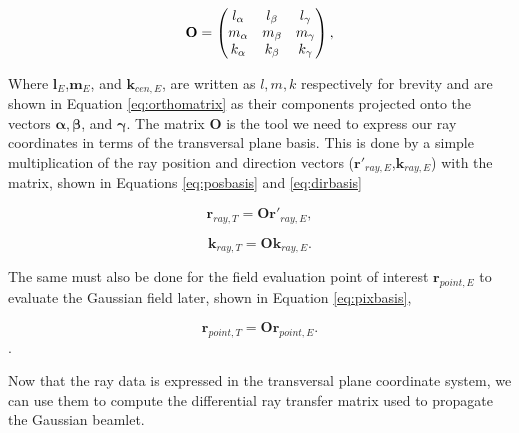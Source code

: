 \begin{equation}
\centering
\mathbf{O} = 
    \begin{pmatrix}
     l_{\alpha} & l_{\beta} & l_{\gamma} \\
     m_{\alpha} & m_{\beta} & m_{\gamma} \\
     k_{\alpha} & k_{\beta} & k_{\gamma} \\
    \end{pmatrix},
    \label{eq:orthomatrix}
\end{equation}

Where $\mathbf{l}_{E}$,$\mathbf{m}_{E}$, and $\mathbf{k}_{cen,E}$, are written as $l,m,k$ respectively for brevity and are shown in Equation \ref{eq:orthomatrix} as their components projected onto the vectors $\boldsymbol{\alpha},\boldsymbol{\beta}$, and $\boldsymbol{\gamma}$. The matrix $\mathbf{O}$ is the tool we need to express our ray coordinates in terms of the transversal plane basis. This is done by a simple multiplication of the ray position and direction vectors ($\mathbf{r}'_{ray,E}$,$\mathbf{k}_{ray,E}$) with the matrix, shown in Equations \ref{eq:posbasis} and \ref{eq:dirbasis}

\begin{equation}
    \mathbf{r}_{ray,T} = \mathbf{O}\mathbf{r}'_{ray,E},
    \label{eq:posbasis}
\end{equation}

\begin{equation}
    \mathbf{k}_{ray,T} = \mathbf{O}\mathbf{k}_{ray,E}.
    \label{eq:dirbasis}
\end{equation}

The same must also be done for the field evaluation point of interest $\mathbf{r}_{point,E}$ to evaluate the Gaussian field later, shown in Equation \ref{eq:pixbasis},

\begin{equation}
    \mathbf{r}_{point,T} = \mathbf{O}\mathbf{r}_{point,E}.
    \label{eq:pixbasis}
\end{equation}.

Now that the ray data is expressed in the transversal plane coordinate system, we can use them to compute the differential ray transfer matrix used to propagate the Gaussian beamlet.

